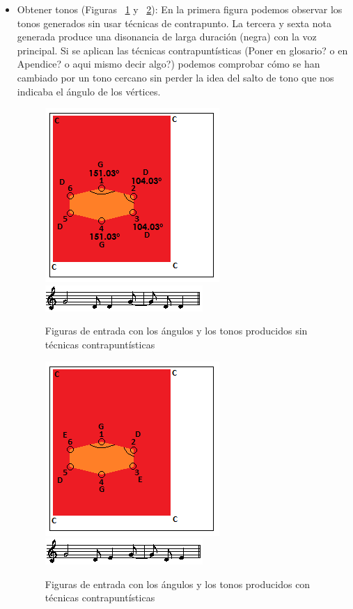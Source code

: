 \begin{itemize}
	\item Obtener tonos (Figuras ~\ref{fig:Figura3Voz2} y ~\ref{fig:Figura4Voz2}): En la primera figura podemos observar los tonos generados sin usar técnicas de contrapunto. La tercera y sexta nota generada produce una disonancia de larga duración (negra) con la voz principal. Si se aplican las técnicas contrapuntísticas \color{red}(Poner en glosario? o en Apendice? o aqui mismo decir algo?) \color{blue}podemos comprobar cómo se han cambiado por un tono cercano sin perder la idea del salto de tono que nos indicaba el ángulo de los vértices.

		\begin{figure}[!htbp]
		\centering
		\hspace*{0.0in}
		\includegraphics[scale=1]{graphics/simpletest4-F3.png}
		\includegraphics[scale=1]{graphics/simpletest4-F3-MEL2partitura.png}
		\caption{Figuras de entrada con los ángulos y los tonos producidos sin técnicas contrapuntísticas}
		\label{fig:Figura3Voz2}
		\end{figure}

		\begin{figure}[!htbp]
		\centering
		\hspace*{0.0in}
		\includegraphics[scale=1]{graphics/simpletest4-F3_2.png}
		\includegraphics[scale=1]{graphics/simpletest4-F3_2-MEL2partitura.png}
		\caption{Figuras de entrada con los ángulos y los tonos producidos con técnicas contrapuntísticas}
		\label{fig:Figura4Voz2}
		\end{figure}


\end{itemize}
